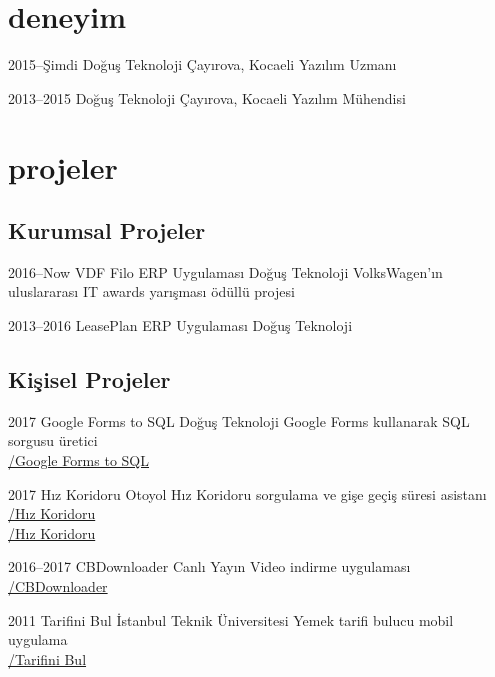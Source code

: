 \documentclass[]{../friggeri-cv} %
\begin{document}
\section{deneyim}

\begin{entrylist}

\entry
{2015--Şimdi}
{Doğuş Teknoloji}
{Çayırova, Kocaeli}
{Yazılım Uzmanı}

\entry
{2013--2015}
{Doğuş Teknoloji}
{Çayırova, Kocaeli}
{Yazılım Mühendisi}

\end{entrylist}

\section{projeler}

\subsection{Kurumsal Projeler}

\begin{entrylist}

\entry
{2016--Now}
{VDF Filo ERP Uygulaması}
{Doğuş Teknoloji}
{VolksWagen'ın uluslararası IT awards yarışması ödüllü projesi}

\entry
{2013--2016}
{LeasePlan ERP Uygulaması}
{Doğuş Teknoloji}
{}

\end{entrylist}

\subsection{Kişisel Projeler}

\begin{entrylist}

\entry
{2017}
{Google Forms to SQL}
{Doğuş Teknoloji}
{Google Forms kullanarak SQL sorgusu üretici
\\\href{https://github.com/suphero/Google-Forms-to-SQL}{\faGithub/Google Forms to SQL}}

\entry
{2017}
{Hız Koridoru}
{}
{Otoyol Hız Koridoru sorgulama ve gişe geçiş süresi asistanı
\\\href{https://play.google.com/store/apps/details?id=com.harunsokullu.speedcorridor}{\faAndroid/Hız Koridoru}
\\\href{https://itunes.apple.com/tr/app/h\%C4\%B1z-koridoru/id1265151812}{\faApple/Hız Koridoru}}

\entry
{2016--2017}
{CBDownloader}
{}
{Canlı Yayın Video indirme uygulaması
\\\href{https://github.com/suphero/CBDownloader}{\faGithub/CBDownloader}}

\entry
{2011}
{Tarifini Bul}
{İstanbul Teknik Üniversitesi}
{Yemek tarifi bulucu mobil uygulama
\\\href{https://play.google.com/store/apps/details?id=com.tarifinibul}{\faAndroid/Tarifini Bul}}

\end{entrylist}
\end{document}
